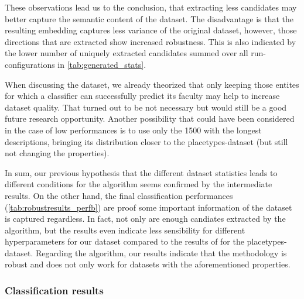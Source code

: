These observations lead us to the conclusion, that extracting less candidates may better capture the semantic content of the dataset. The disadvantage is that the resulting embedding captures less variance of the original dataset, however, those directions that are extracted show increased robustness. This is also indicated by the lower number of uniquely extracted candidates summed over all run-configurations in \autoref{tab:generated_stats}. 

When discussing the dataset, we already theorized that only keeping those entites for which a classifier can successfully predict its faculty may help to increase dataset quality. That turned out to be not necessary but would still be a good future research opportunity. Another possibility that could have been considered in the case of low performances is to use only the 1500 with the longest descriptions, bringing its distribution closer to the placetypes-dataset (but still not changing the properties). 


In sum, our previous hypothesis that the different dataset statistics leads to different conditions for the algorithm seems confirmed by the intermediate results. On the other hand, the final classification performances (\autoref{tab:robustresults_perfb}) are proof some important information of the dataset is captured regardless. In fact, not only are enough candiates extracted by the algorithm, but the results even indicate less sensibility for different hyperparameters for our dataset compared to the results of \cite{Derrac2015} for the placetypes-dataset. Regarding the algorithm, our results indicate that the methodology is robust and does not only work for datasets with the aforementioned properties.

\subsubsection{Classification results}



